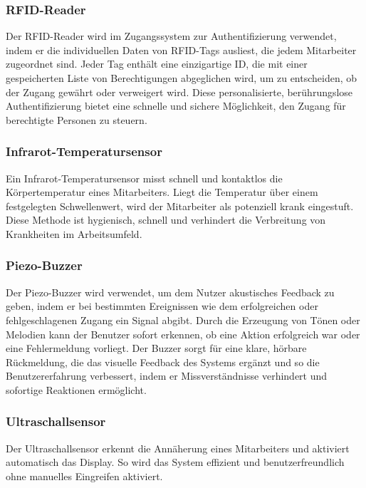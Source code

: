 \subsubsection{RFID-Reader}

Der RFID-Reader wird im Zugangssystem zur Authentifizierung verwendet, indem er die individuellen Daten von RFID-Tags ausliest, die jedem Mitarbeiter zugeordnet sind. Jeder Tag enthält eine einzigartige ID, die mit einer gespeicherten Liste von Berechtigungen abgeglichen wird, um zu entscheiden, ob der Zugang gewährt oder verweigert wird. Diese personalisierte, berührungslose Authentifizierung bietet eine schnelle und sichere Möglichkeit, den Zugang für berechtigte Personen zu steuern.

\subsubsection{Infrarot-Temperatursensor}

Ein Infrarot-Temperatursensor misst schnell und kontaktlos die Körpertemperatur eines Mitarbeiters. Liegt die Temperatur über einem festgelegten Schwellenwert, wird der Mitarbeiter als potenziell krank eingestuft. Diese Methode ist hygienisch, schnell und verhindert die Verbreitung von Krankheiten im Arbeitsumfeld.

\subsubsection{Piezo-Buzzer}

Der Piezo-Buzzer wird verwendet, um dem Nutzer akustisches Feedback zu geben, indem er bei bestimmten Ereignissen wie dem erfolgreichen oder fehlgeschlagenen Zugang ein Signal abgibt. Durch die Erzeugung von Tönen oder Melodien kann der Benutzer sofort erkennen, ob eine Aktion erfolgreich war oder eine Fehlermeldung vorliegt. Der Buzzer sorgt für eine klare, hörbare Rückmeldung, die das visuelle Feedback des Systems ergänzt und so die Benutzererfahrung verbessert, indem er Missverständnisse verhindert und sofortige Reaktionen ermöglicht.

\subsubsection{Ultraschallsensor}

Der Ultraschallsensor erkennt die Annäherung eines Mitarbeiters und aktiviert automatisch das Display. So wird das System effizient und benutzerfreundlich ohne manuelles Eingreifen aktiviert.

